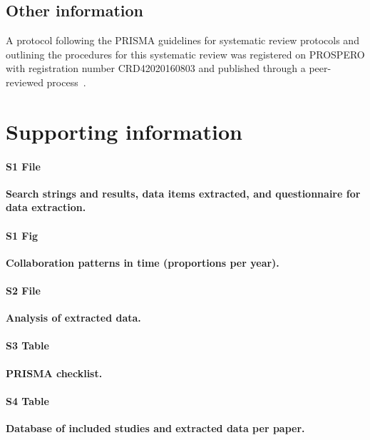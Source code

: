 \documentclass[10pt,letterpaper]{article}
\begin{document}
\subsection*{Other information}
A protocol following the PRISMA guidelines for systematic review protocols and outlining the procedures for this systematic review was registered on PROSPERO with registration number CRD42020160803 and published through a peer-reviewed process~\cite{Azam2020}. 

\section*{Supporting information}

\paragraph*{S1 File}
\label{S1_File}
{\bf Search strings and results, data items extracted, and questionnaire for data extraction.} 

\paragraph*{S1 Fig}
\label{S1_Fig}
{\bf Collaboration patterns in time (proportions per year).}

\paragraph*{S2 File}
\label{S2_File}
{\bf Analysis of extracted data.} 

\paragraph*{S3 Table}
\label{S3_Table}
{\bf PRISMA checklist.} 

\paragraph*{S4 Table}
\label{S4_Table}
{\bf Database of included studies and extracted data per paper.} 




\nolinenumbers
\end{document}
